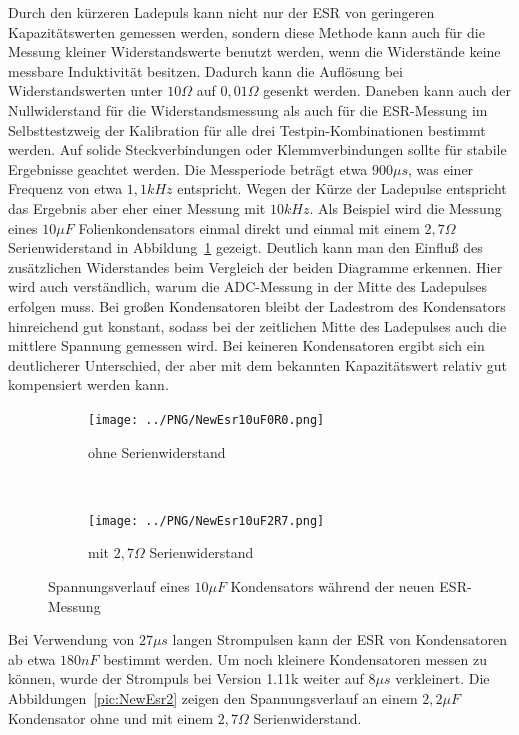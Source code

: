 Durch den kürzeren Ladepuls kann nicht nur der ESR von geringeren Kapazitätswerten gemessen werden, sondern
diese Methode kann auch für die Messung kleiner Widerstandswerte benutzt werden, wenn die Widerstände
keine messbare Induktivität besitzen. Dadurch kann die Auflösung bei Widerstandswerten unter \(10\Omega\) auf 
\(0,01\Omega\) gesenkt werden. Daneben kann auch der Nullwiderstand für die Widerstandsmessung als auch
für die ESR-Messung im Selbsttestzweig der Kalibration für alle drei Testpin-Kombinationen bestimmt werden.
Auf solide Steckverbindungen oder Klemmverbindungen sollte für stabile Ergebnisse geachtet werden.
Die Messperiode beträgt etwa \(900\mu s\), was einer Frequenz von etwa \(1,1kHz\) entspricht.
Wegen der Kürze der Ladepulse entspricht das Ergebnis aber eher einer Messung mit \(10kHz\).
Als Beispiel wird die Messung eines \(10\mu F\) Folienkondensators einmal direkt und einmal mit einem
\(2,7\Omega\) Serienwiderstand in Abbildung~\ref{pic:NewEsr10} gezeigt.
Deutlich kann man den Einfluß des zusätzlichen Widerstandes beim Vergleich der beiden Diagramme erkennen.
Hier wird auch verständlich, warum die ADC-Messung in der Mitte des Ladepulses erfolgen muss.
Bei großen Kondensatoren bleibt der Ladestrom des Kondensators hinreichend gut konstant,
sodass bei der zeitlichen Mitte des Ladepulses auch die mittlere Spannung gemessen wird.
Bei keineren Kondensatoren ergibt sich ein deutlicherer Unterschied, der aber mit dem
bekannten Kapazitätswert relativ gut kompensiert werden kann.

\begin{figure}[H]
  \begin{subfigure}[b]{9cm}
    \centering
    \texttt{[image: ../PNG/NewEsr10uF0R0.png]}
    \caption{ohne Serienwiderstand}
  \end{subfigure}
  ~
  \begin{subfigure}[b]{9cm}
    \centering
    \texttt{[image: ../PNG/NewEsr10uF2R7.png]}
    \caption{mit \(2,7\Omega\) Serienwiderstand}
  \end{subfigure}
  \caption{Spannungsverlauf eines \(10\mu F\) Kondensators während der neuen ESR-Messung}
  \label{pic:NewEsr10}
\end{figure}

Bei Verwendung von \(27\mu s\) langen Strompulsen kann der ESR von Kondensatoren ab etwa \(180nF\) bestimmt werden.
Um noch kleinere Kondensatoren messen zu können, wurde der Strompuls bei Version 1.11k weiter auf \(8\mu s\) verkleinert.
Die Abbildungen~\ref{pic:NewEsr2} zeigen den Spannungsverlauf an einem \(2,2\mu F\) Kondensator ohne und mit
einem \(2,7\Omega\) Serienwiderstand.

